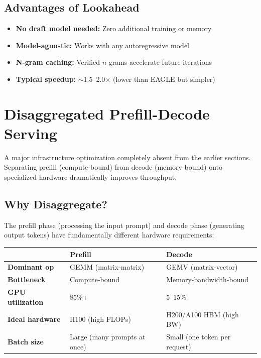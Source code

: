 \documentclass[11pt,a4paper]{article}
\begin{document}
\subsection{Advantages of Lookahead}

\begin{itemize}[itemsep=1pt]
  \item \textbf{No draft model needed:} Zero additional training or memory
  \item \textbf{Model-agnostic:} Works with any autoregressive model
  \item \textbf{N-gram caching:} Verified $n$-grams accelerate future iterations
  \item \textbf{Typical speedup:} $\sim$1.5--2.0$\times$ (lower than EAGLE but simpler)
\end{itemize}

\section{Disaggregated Prefill-Decode Serving}

A major infrastructure optimization completely absent from the earlier sections. Separating prefill (compute-bound) from decode (memory-bound) onto specialized hardware dramatically improves throughput.

\subsection{Why Disaggregate?}

The prefill phase (processing the input prompt) and decode phase (generating output tokens) have fundamentally different hardware requirements:

\begin{center}
\begin{tabular}{lL{5cm}L{5cm}}
\toprule
& \textbf{Prefill} & \textbf{Decode} \\
\midrule
\textbf{Dominant op} & GEMM (matrix-matrix) & GEMV (matrix-vector) \\
\textbf{Bottleneck} & Compute-bound & Memory-bandwidth-bound \\
\textbf{GPU utilization} & 85\%+ & 5--15\% \\
\textbf{Ideal hardware} & H100 (high FLOPs) & H200/A100 HBM (high BW) \\
\textbf{Batch size} & Large (many prompts at once) & Small (one token per request) \\
\bottomrule
\end{tabular}
\end{center}
\end{document}
